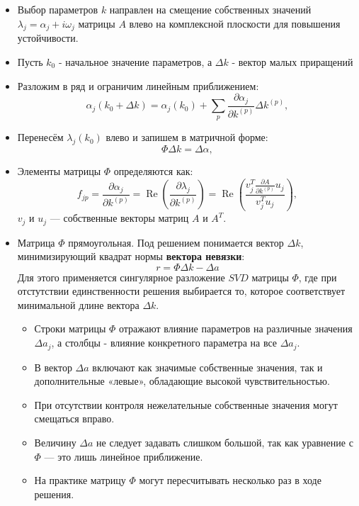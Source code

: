 	\begin{itemize}
		\item Выбор параметров \(k\) направлен на смещение собственных значений \(\lambda_j = \alpha_j + i\omega_j\) матрицы \(A\) влево на комплексной плоскости для повышения устойчивости.
		\item Пусть \(k_0\) - начальное значение параметров, а \(\Delta k\) - вектор малых приращений
		\item Разложим в ряд и ограничим линейным приближением: 
		\begin{equation}
			\alpha_j(k_0 + \Delta k) = \alpha_j(k_0) + \sum_p \frac{\partial \alpha_j}{\partial k^{(p)}} \Delta k^{(p)},
		\end{equation}
		\item Перенесём \(\lambda_j(k_0)\) влево и запишем в матричной форме:
		\begin{equation}
			\Phi \Delta k = \Delta \alpha,
		\end{equation}
		\item Элементы матрицы \(\Phi\) определяются как:
		\begin{equation}
			f_{jp} = \frac{\partial \alpha_j}{\partial k^{(p)}} = \operatorname{Re} \left( \frac{\partial \lambda_j}{\partial k^{(p)}} \right) = \operatorname{Re} \left( \frac{v_j^T \frac{\partial A}{\partial k^{(p)}} u_j}{v_j^T u_j} \right),
		\end{equation}
		\(v_j\) и \(u_j\) — собственные векторы матриц \(A\) и \(A^T\). 
		\item Матрица \(\Phi\) прямоугольная. Под решением понимается вектор \(\Delta k\), минимизирующий квадрат нормы \textbf{вектора невязки}:
		\begin{equation}
			r = \Phi \Delta k - \Delta a
		\end{equation}
		Для этого применяется сингулярное разложение \(SVD\) матрицы \(\Phi\), где при отстутствии единственности решения выбирается то, которое соответствует минимальной длине вектора \(\Delta k\).
		\begin{itemize}
			\item Строки матрицы \(\Phi\) отражают влияние параметров на различные значения \(\Delta a_j\), а столбцы - влияние конкретного параметра на все \(\Delta a_j\).
			\item В вектор \(\Delta a\) включают как значимые собственные значения, так и дополнительные «левые», обладающие высокой чувствительностью.
			\item При отсутствии контроля нежелательные собственные значения могут смещаться вправо.
			\item Величину \(\Delta a\) не следует задавать слишком большой, так как уравнение с \(\Phi\) — это лишь линейное приближение.
			\item На практике матрицу \(\Phi\) могут пересчитывать несколько раз в ходе решения.
		\end{itemize}
	\end{itemize}
	
	
	
